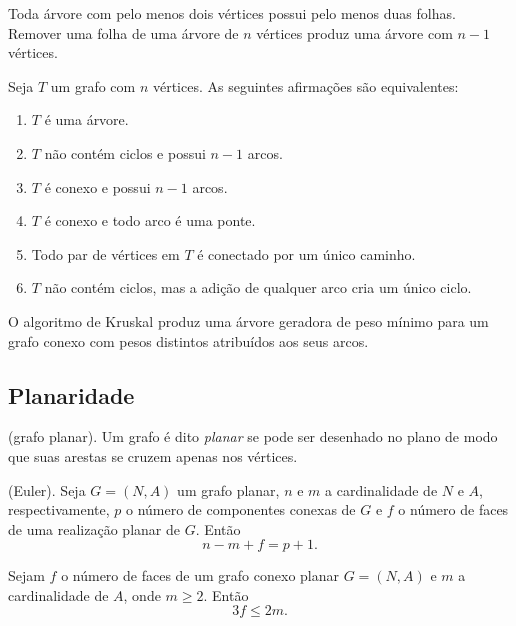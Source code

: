 \documentclass{article}
\begin{document}
\begin{lem}
    Toda árvore com pelo menos dois vértices possui pelo menos duas folhas. Remover uma folha de uma árvore de \(n\) vértices produz uma árvore com \(n-1\) vértices.
\end{lem}

\begin{thm}
    Seja \(T\) um grafo com \(n\) vértices. As seguintes afirmações são equivalentes:
    \begin{enumerate}
        \item \(T\) é uma árvore.
        \item \(T\) não contém ciclos e possui \(n-1\) arcos.
        \item \(T\) é conexo e possui \(n-1\) arcos.
        \item \(T\) é conexo e todo arco é uma ponte.
        \item Todo par de vértices em \(T\) é conectado por um único caminho.
        \item \(T\) não contém ciclos, mas a adição de qualquer arco cria um único ciclo.
    \end{enumerate}
\end{thm}

\begin{thm}
    O algoritmo de Kruskal produz uma árvore geradora de peso mínimo para um grafo conexo com pesos distintos atribuídos aos seus arcos.
\end{thm}

\subsection{Planaridade}

\begin{defn} (grafo planar).
    Um grafo é dito \emph{planar} se pode ser desenhado no plano de modo que suas arestas se cruzem apenas nos vértices.
\end{defn}

\begin{thm} (Euler).
    Seja \(G = (N, A)\) um grafo planar, \(n\) e \(m\) a cardinalidade de \(N\) e \(A\), respectivamente, \(p\) o número de componentes conexas de \(G\) e \(f\) o número de faces de uma realização planar de \(G\). Então 
    \begin{equation}
        n - m + f = p + 1.
    \end{equation}
\end{thm}

\begin{lem}
    Sejam \(f\) o número de faces de um grafo conexo planar \(G = (N, A)\) e \(m\) a cardinalidade de \(A\), onde \(m \geq 2\). Então 
    \begin{equation}
        3f \leq 2m.
    \end{equation}
\end{lem}
\end{document}
